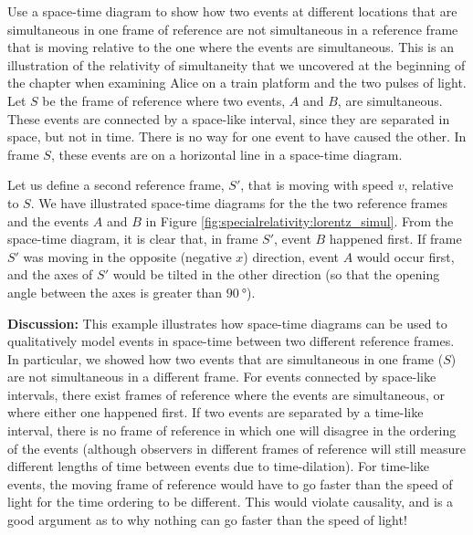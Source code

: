 \begin{example}{Use a space-time diagram to show how two events at different locations that are simultaneous in one frame of reference are not simultaneous in a reference frame that is moving relative to the one where the events are simultaneous. This is an illustration of the relativity of simultaneity that we uncovered at the beginning of the chapter when examining Alice on a train platform and the two pulses of light.}
Let $S$ be the frame of reference where two events, $A$ and $B$, are simultaneous. These events are connected by a space-like interval, since they are separated in space, but not in time. There is no way for one event to have caused the other. In frame $S$, these events are on a horizontal line in a space-time diagram.

Let us define a second reference frame, $S'$, that is moving with speed $v$, relative to $S$. We have illustrated space-time diagrams for the the two reference frames and the events $A$ and $B$ in Figure \ref{fig:specialrelativity:lorentz_simul}.
From the space-time diagram, it is clear that, in frame $S'$, event $B$ happened first. If frame $S'$ was moving in the opposite (negative $x$) direction, event $A$ would occur first, and the axes of $S'$ would be tilted in the other direction (so that the opening angle between the axes is greater than $\SI{90}{\degree}$).

\textbf{Discussion: }This example illustrates how space-time diagrams can be used to qualitatively model events in space-time between two different reference frames. In particular, we showed how two events that are simultaneous in one frame ($S$) are not simultaneous in a different frame. For events connected by space-like intervals, there exist frames of reference where the events are simultaneous, or where either one happened first. If two events are separated by a time-like interval, there is no frame of reference in which one will disagree in the ordering of the events (although observers in different frames of reference will still measure different lengths of time between events due to time-dilation). For time-like events, the moving frame of reference would have to go faster than the speed of light for the time ordering to be different. This would violate causality, and is a good argument as to why nothing can go faster than the speed of light!
\end{example}

